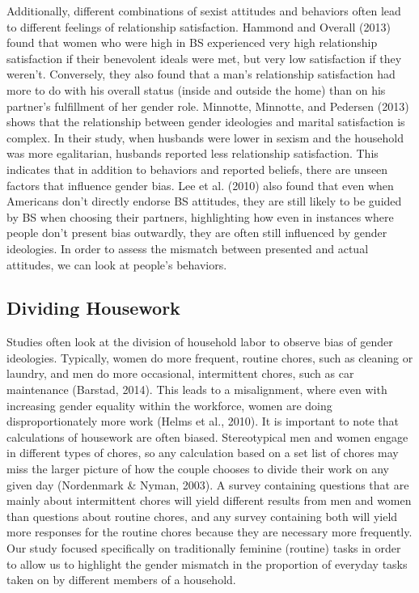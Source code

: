 \documentclass[
  english,
  man]{apa6}
\begin{document}
Additionally, different combinations of sexist attitudes and behaviors often lead to different feelings of relationship satisfaction. Hammond and Overall (2013) found that women who were high in BS experienced very high relationship satisfaction if their benevolent ideals were met, but very low satisfaction if they weren't. Conversely, they also found that a man's relationship satisfaction had more to do with his overall status (inside and outside the home) than on his partner's fulfillment of her gender role. Minnotte, Minnotte, and Pedersen (2013) shows that the relationship between gender ideologies and marital satisfaction is complex. In their study, when husbands were lower in sexism and the household was more egalitarian, husbands reported less relationship satisfaction. This indicates that in addition to behaviors and reported beliefs, there are unseen factors that influence gender bias. Lee et al. (2010) also found that even when Americans don't directly endorse BS attitudes, they are still likely to be guided by BS when choosing their partners, highlighting how even in instances where people don't present bias outwardly, they are often still influenced by gender ideologies. In order to assess the mismatch between presented and actual attitudes, we can look at people's behaviors.

\hypertarget{dividing-housework}{%
\subsection{Dividing Housework}\label{dividing-housework}}

Studies often look at the division of household labor to observe bias of gender ideologies. Typically, women do more frequent, routine chores, such as cleaning or laundry, and men do more occasional, intermittent chores, such as car maintenance (Barstad, 2014). This leads to a misalignment, where even with increasing gender equality within the workforce, women are doing disproportionately more work (Helms et al., 2010). It is important to note that calculations of housework are often biased. Stereotypical men and women engage in different types of chores, so any calculation based on a set list of chores may miss the larger picture of how the couple chooses to divide their work on any given day (Nordenmark \& Nyman, 2003). A survey containing questions that are mainly about intermittent chores will yield different results from men and women than questions about routine chores, and any survey containing both will yield more responses for the routine chores because they are necessary more frequently. Our study focused specifically on traditionally feminine (routine) tasks in order to allow us to highlight the gender mismatch in the proportion of everyday tasks taken on by different members of a household.
\end{document}
